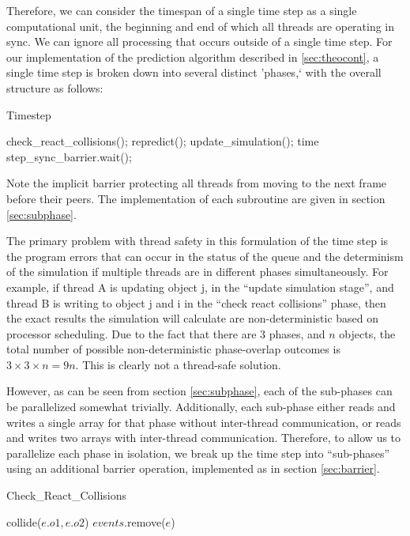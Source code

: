 \documentclass[CEJCS,PDF]{cej} %
\begin{document}
Therefore, we can consider the timespan of a single time step as a single computational unit, the beginning and end of which all threads are operating in sync.  We can ignore
all processing that occurs outside of a single time step.  For our implementation of the prediction algorithm described in \ref{sec:theocont}, a single time step is broken down
into several distinct 'phases,` with the overall structure as follows:

\begin{algorithm}
\caption{Timestep}
\begin{algorithmic}
\STATE check\_react\_collisions();
\STATE repredict();
\STATE update\_simulation();
\STATE time step\_sync\_barrier.wait();
\end{algorithmic}
\end{algorithm}

Note the implicit barrier protecting all threads from moving to the next frame before their peers.  The implementation of each subroutine are given in section \ref{sec:subphase}.

The primary problem with thread safety in this formulation of the time step is the program errors that can occur in the status of the queue and the determinism of the simulation
if multiple threads are in different phases simultaneously.  For example, if thread A is updating object j, in the ``update simulation stage'', and thread B is writing to object 
j and i in the ``check react collisions'' phase, then the exact results the simulation will calculate are non-deterministic based on processor scheduling.  
Due to the fact that there are 3 phases, and $n$ objects, the total number of possible non-deterministic phase-overlap outcomes is $3\times3\times n=9n$.  This is clearly not a thread-safe solution.

However, as can be seen from section \ref{sec:subphase}, each of the sub-phases can be parallelized somewhat trivially.  Additionally, each sub-phase either reads and writes
a single array for that phase without inter-thread communication, or reads and writes two arrays with inter-thread communication.  Therefore, to allow us to parallelize each
phase in isolation, we break up the time step into ``sub-phases'' using an additional barrier operation, implemented as in section \ref{sec:barrier}.  

\begin{algorithm}
\caption{Check\_React\_Collisions}
\begin{algorithmic}
\STATE {}
	\STATE {}
		\STATE {}
		\STATE collide($e.o1,e.o2$)
	\ENDIF
	\STATE {}
	\STATE $events$.remove($e$)
\ENDFOR
\end{algorithmic}
\end{algorithm}
\end{document}
